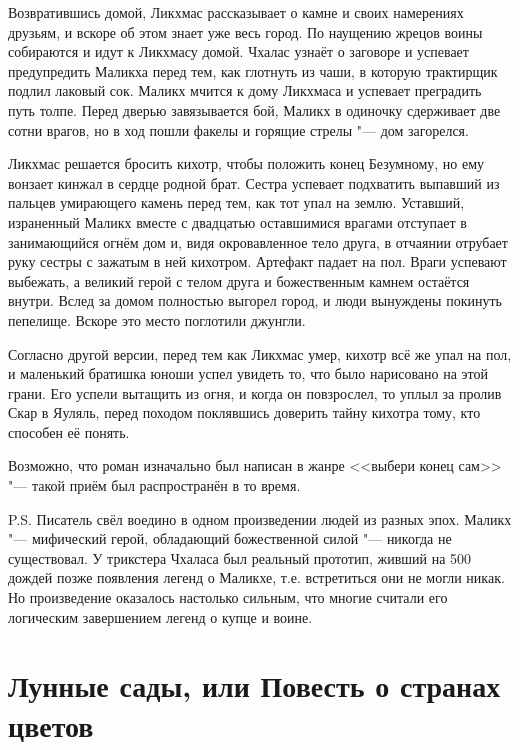 Возвратившись домой, Ликхмас рассказывает о камне и своих намерениях друзьям, и вскоре об этом знает уже весь город.
По наущению жрецов воины собираются и идут к Ликхмасу домой.
Чхалас узнаёт о заговоре и успевает предупредить Маликха перед тем, как глотнуть из чаши, в которую трактирщик подлил лаковый сок.
Маликх мчится к дому Ликхмаса и успевает преградить путь толпе.
Перед дверью завязывается бой, Маликх в одиночку сдерживает две сотни врагов, но в ход пошли факелы и горящие стрелы "--- дом загорелся.

Ликхмас решается бросить кихотр, чтобы положить конец Безумному, но ему вонзает кинжал в сердце родной брат.
Сестра успевает подхватить выпавший из пальцев умирающего камень перед тем, как тот упал на землю.
Уставший, израненный Маликх вместе с двадцатью оставшимися врагами отступает в занимающийся огнём дом и, видя окровавленное тело друга, в отчаянии отрубает руку сестры с зажатым в ней кихотром.
Артефакт падает на пол.
Враги успевают выбежать, а великий герой с телом друга и божественным камнем остаётся внутри.
Вслед за домом полностью выгорел город, и люди вынуждены покинуть пепелище\footnotemark.
Вскоре это место поглотили джунгли.

Согласно другой версии, перед тем как Ликхмас умер, кихотр всё же упал на пол, и маленький братишка юноши успел увидеть то, что было нарисовано на этой грани.
Его успели вытащить из огня, и когда он повзрослел, то уплыл за пролив Скар в Яуляль, перед походом поклявшись доверить тайну кихотра тому, кто способен её понять.

Возможно, что роман изначально был написан в жанре <<выбери конец сам>> "--- такой приём был распространён в то время.

P.S. Писатель свёл воедино в одном произведении людей из разных эпох.
Маликх "--- мифический герой, обладающий божественной силой "--- никогда не существовал.
У трикстера Чхаласа был реальный прототип, живший на 500 дождей позже появления легенд о Маликхе, т.е. встретиться они не могли никак.
Но произведение оказалось настолько сильным, что многие считали его логическим завершением легенд о купце и воине.

\section{Лунные сады, или Повесть о странах цветов}

